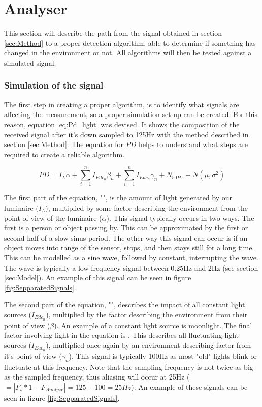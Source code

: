 \chapter{Analyser}
\label{chp:Analyser}
This section will describe the path from the signal obtained in section \ref{sec:Method} to a proper detection algorithm, able to determine if something has changed in the environment or not. All algorithms will then be tested against a simulated signal.

\subsection{Simulation of the signal}
The first step in creating a proper algorithm, is to identify what signals are affecting the measurement, so a proper simulation set-up can be created. For this reason, equation \ref{eq:Pd_light} was devised. It shows the composition of the received signal  after it's down sampled to 125Hz with the method described in section \ref{sec:Method}. The equation for $PD$ helps to understand what steps are required to create a reliable algorithm.

\begin{equation}
\label{eq:Pd_light}
PD = I_{L} \alpha + \sum_{i=1}^n I_{Edc_{n}} \beta_{n} + \sum_{i=1}^n I_{Eac{_n}} \gamma_{n} + N_{50Hz} + N(\mu,\sigma^2)
\end{equation}

The first part of the equation, "", is the amount of light generated by our luminaire ($I_{L}$), multiplied by some factor describing the environment from the point of view of the luminaire ($\alpha$). This signal typically occurs in two ways. The first is a person or object passing by. This can be approximated by the first or second half of a slow sinus period. The other way this signal can occur is if an object moves into range of the sensor, stops, and then stays still for a long time. This can be modelled as a sine wave, followed by constant, interrupting the wave. The wave is typically a low frequency signal between 0.25Hz and 2Hz (see section \ref{sec:Model}). An example of this signal can be seen in figure \ref{fig:SepparatedSignals}.

The second part of the equation, "", describes the impact of all constant light sources ($I_{Edc_{n}}$), multiplied by the factor describing the environment from their point of view ($\beta$). An example of a constant light source is moonlight. The final factor involving light in the equation is . This describes all fluctuating light sources ($I_{Eac_{n}}$), multiplied once again by an environment describing factor from it's point of view ($\gamma_{n}$). This signal is typically 100Hz as most "old" lights blink or fluctuate at this frequency. Note that the sampling frequency is not twice as big as the sampled frequency, thus aliasing will occur at 25Hz ($= |F_{s} * 1 - F_{Analyze}| = 125 - 100 = 25Hz$)\cite{aliassing}. An example of these signals can be seen in figure \ref{fig:SepparatedSignals}.

